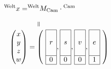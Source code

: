 \begin{align*}
&&{}^{\text{Welt}}x = &{}^{\text{Welt}}M_\text{Cam} \cdot {}^\text{Cam}&&\\
	&&&~~~~\rotatebox{-90}{=}&&\\
	&&\vektor{x\\y\\z\\w} &= \left(~
	\begin{array}{|c|}%
		\hline%
		\multirow{3}{*}{$r$}\\ \\ \\%
		\hline%
		0\\%
		\hline%
		\end{array},
		\begin{array}{|c|}%
		\hline%
		\multirow{3}{*}{$s$}\\ \\ \\%
		\hline%
		0\\%
		\hline%
		\end{array},
		\begin{array}{|c|}%
		\hline%
		\multirow{3}{*}{$v$}\\ \\ \\%
		\hline%
		0\\%
		\hline%
		\end{array},
		\begin{array}{|c|}%
		\hline%
		\multirow{3}{*}{$e$}\\ \\ \\%
		\hline%
		1\\%
		\hline%
		\end{array} ~\right)&&
\end{align*}